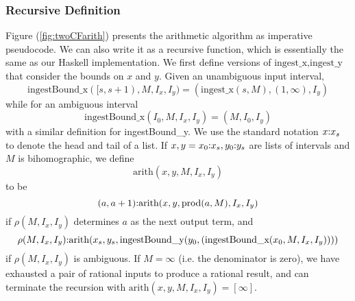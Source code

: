 \documentclass[11pt, oneside]{amsart}   	%
\renewcommand{\:}{\negthickspace:\negthickspace}
\begin{document}
\subsubsection{Recursive Definition}
Figure (\ref{fig:twoCFarith}) presents the arithmetic algorithm as imperative pseudocode. We can also write it as a recursive function,
which is essentially the same as our Haskell implementation.
We first define versions of $\mbox{ingest\_x},\mbox{ingest\_y}$ that consider the bounds on $x$ and $y$. Given an unambiguous input interval,
\[
\mbox{ingestBound\_x}([s,s+1), M, I_x, I_y) = 
(\mbox{ingest\_x}(s,M), (1,\infty),I_y)
\]
while for an ambiguous interval
\[
\mbox{ingestBound\_x}(I_0, M, I_x, I_y) = 
(M, I_0,I_y)
\]
with a similar definition for \mbox{ingestBound\_y}.
We use the standard notation $x\:x_s$ to denote the head and tail of a list. 
If $x,y = x_0\:x_s, y_0\:y_s$ are lists of intervals and $M$ is bihomographic, we define
\[
\mbox{arith}(x,y, M, I_x, I_y)
\]
to be
\[
(a,a+1)\:\mbox{arith}(x,y,  \mbox{prod}(a,M) ,  I_x,  I_y)
\]
if $\rho(M,I_x,I_y)$ determines $a$ as the next output term, and
\[
\rho(M,I_x,I_y)\:\mbox{arith}(x_s,y_s,  \mbox{ingestBound\_y}( y_0, (\mbox{ingestBound\_x}(x_0,M,I_x,I_y)) ))
\]
if $\rho(M,I_x,I_y)$ is ambiguous. If $M=\infty$ (i.e. the denominator is zero), we have exhausted a pair of rational inputs to produce a rational result, and can terminate the recursion with $\mbox{arith}(x,y, M, I_x, I_y) = [\infty]$.

\end{document}
